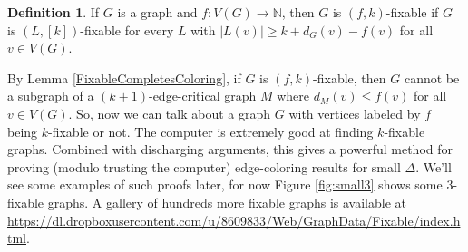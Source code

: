 \documentclass[12pt]{article}
\theoremstyle{plain}
\theoremstyle{definition}
\newtheorem{defn}{Definition}
\theoremstyle{remark}
\newcommand{\IN}{\mathbb{N}}
\newcommand{\func}[3]{#1\colon #2 \rightarrow #3}
\newcommand{\irange}[1]{\left[#1\right]}
\begin{document}
\begin{defn}
If $G$ is a graph and $\func{f}{V(G)}{\IN}$, then $G$ is $(f,k)$-fixable if $G$ is $(L, \irange{k})$-fixable for every $L$ with $|L(v)| \ge k + d_{G}(v) - f(v)$ for all $v \in V(G)$.
\end{defn}

By Lemma \ref{FixableCompletesColoring}, if $G$ is $(f,k)$-fixable, then $G$ cannot be a subgraph of a $(k+1)$-edge-critical graph $M$ where $d_M(v) \le f(v)$ for all $v \in V(G)$.  
So, now we can talk about a graph $G$ with vertices labeled by $f$ being $k$-fixable or not.  The computer is extremely good at finding $k$-fixable graphs.  Combined with discharging arguments, this gives a powerful method for proving (modulo trusting the computer) edge-coloring results for small $\Delta$.  We'll see some examples of such proofs later, for now Figure \ref{fig:small3} shows some $3$-fixable graphs.  A gallery of hundreds more fixable graphs is available at \url{https://dl.dropboxusercontent.com/u/8609833/Web/GraphData/Fixable/index.html}.
\end{document}
